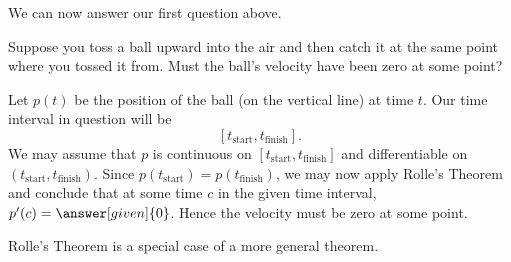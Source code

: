\documentclass{ximera}
\begin{document}
We can now answer our first question above.

\begin{example}
Suppose you toss a ball upward into the air and then catch it at the same point where you tossed it from. Must the
ball's  velocity have been zero at some point?
\begin{explanation}
  Let $p(t)$ be the position  of the ball (on the vertical line) at time $t$. Our time interval in question will be
  \[
  [t_\mathrm{start},t_\mathrm{finish}].
  \]
  We may assume that $p$ is continuous on $ [t_\mathrm{start},t_\mathrm{finish}]$ and differentiable
  on $ (t_\mathrm{start},t_\mathrm{finish})$. Since $p(t_\mathrm{start})=p(t_\mathrm{finish})$, we may now apply Rolle's Theorem and conclude that at some time
  $c$ in the given time interval, $p'(c)=\answer[given]{0}$. Hence the velocity must be zero at
  some point.
\end{explanation}
\end{example}

Rolle's Theorem is a special case of a more general theorem.
\end{document}
